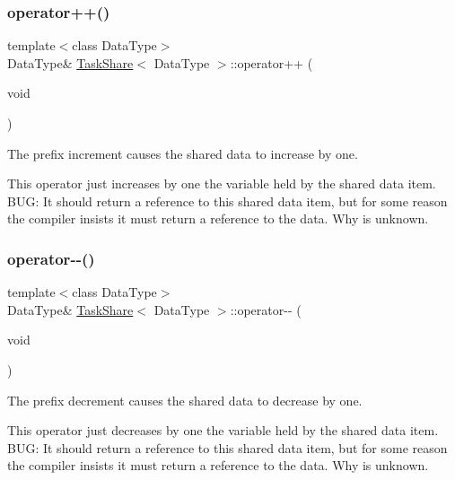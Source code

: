 \subsubsection{\texorpdfstring{operator++()}{operator++()}}
{\footnotesize\ttfamily template$<$class Data\+Type$>$ \\
Data\+Type\& \mbox{\hyperlink{class_task_share}{Task\+Share}}$<$ Data\+Type $>$\+::operator++ (\begin{DoxyParamCaption}\item[{void}]{ }\end{DoxyParamCaption})\hspace{0.3cm}{\ttfamily [inline]}}



The prefix increment causes the shared data to increase by one. 

This operator just increases by one the variable held by the shared data item. B\+UG\+: It should return a reference to this shared data item, but for some reason the compiler insists it must return a reference to the data. Why is unknown. \mbox{\label{class_task_share_a79024a7661f8f48c5d2303a3fe121a32}} 
\subsubsection{\texorpdfstring{operator-\/-\/()}{operator--()}}
{\footnotesize\ttfamily template$<$class Data\+Type$>$ \\
Data\+Type\& \mbox{\hyperlink{class_task_share}{Task\+Share}}$<$ Data\+Type $>$\+::operator-\/-\/ (\begin{DoxyParamCaption}\item[{void}]{ }\end{DoxyParamCaption})\hspace{0.3cm}{\ttfamily [inline]}}



The prefix decrement causes the shared data to decrease by one. 

This operator just decreases by one the variable held by the shared data item. B\+UG\+: It should return a reference to this shared data item, but for some reason the compiler insists it must return a reference to the data. Why is unknown. \mbox{\label{class_task_share_a08835a91ed7ccd847cefe6ff72fe22e6}} 
